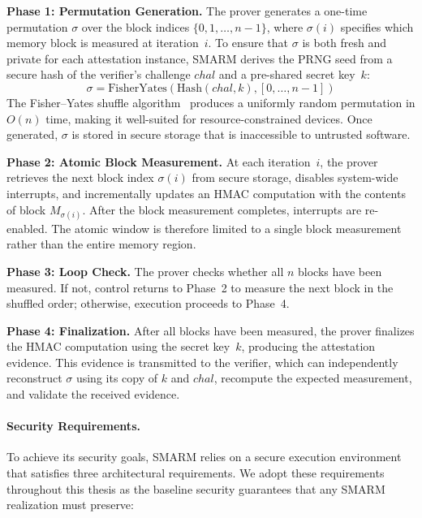\documentclass[a4paper,10pt]{article}
\begin{document}
\textbf{Phase 1: Permutation Generation.}
The prover generates a one-time permutation $\sigma$ over the block 
indices $\{0, 1, \ldots, n-1\}$, where $\sigma(i)$ specifies which 
memory block is measured at iteration~$i$. To ensure that $\sigma$ is 
both fresh and private for each attestation instance, SMARM derives 
the PRNG seed from a secure hash of the verifier's challenge 
$\mathit{chal}$ and a pre-shared secret key~$k$:
\begin{equation}
\sigma = \text{FisherYates}(\text{Hash}(\mathit{chal}, k), 
[0, \ldots, n-1])
\end{equation}
The Fisher--Yates shuffle algorithm~\cite{fisher1938statistical} 
produces a uniformly random permutation in $O(n)$ time, making it 
well-suited for resource-constrained devices. Once generated, 
$\sigma$ is stored in secure storage that is inaccessible to 
untrusted software.

\textbf{Phase 2: Atomic Block Measurement.}
At each iteration~$i$, the prover retrieves the next block index 
$\sigma(i)$ from secure storage, disables system-wide interrupts, 
and incrementally updates an HMAC computation with the contents of 
block $M_{\sigma(i)}$. After the block measurement completes, 
interrupts are re-enabled. The atomic window is therefore limited 
to a single block measurement rather than the entire memory region.

\textbf{Phase 3: Loop Check.}
The prover checks whether all $n$ blocks have been measured. If 
not, control returns to Phase~2 to measure the next block in the 
shuffled order; otherwise, execution proceeds to Phase~4.

\textbf{Phase 4: Finalization.}
After all blocks have been measured, the prover finalizes the HMAC 
computation using the secret key~$k$, producing the attestation 
evidence. This evidence is transmitted to the verifier, which can 
independently reconstruct $\sigma$ using its copy of $k$ and 
$\mathit{chal}$, recompute the expected measurement, and validate 
the received evidence.

\paragraph{Security Requirements.}
To achieve its security goals, SMARM relies on a secure execution 
environment that satisfies three architectural requirements. We 
adopt these requirements throughout this thesis as the baseline 
security guarantees that any SMARM realization must preserve:
\end{document}
